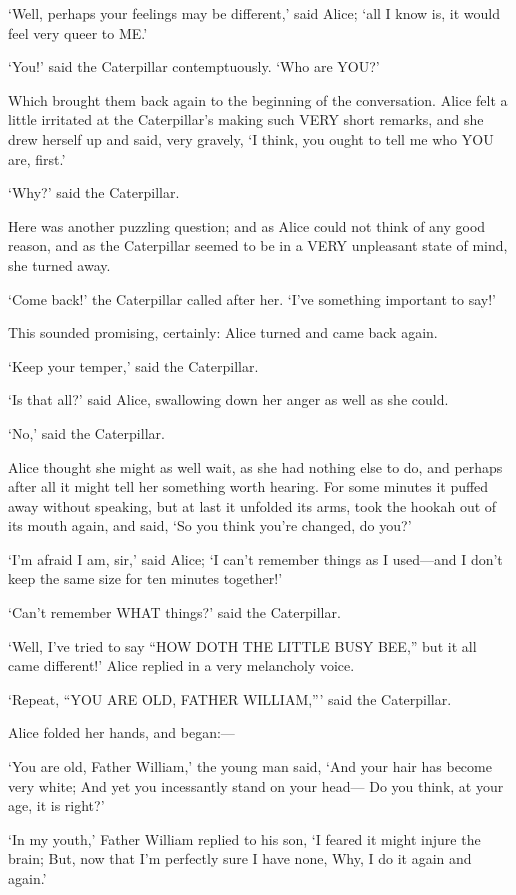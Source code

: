 \documentclass[12pt]{article}
\begin{document}
\begin{Parallel}[p]{}{}
{‘Well, perhaps your feelings may be different,’ said Alice; ‘all I know is, it would feel very queer to ME.’

‘You!’ said the Caterpillar contemptuously. ‘Who are YOU?’

Which brought them back again to the beginning of the conversation. Alice felt a little irritated at the Caterpillar’s making such VERY short remarks, and she drew herself up and said, very gravely, ‘I think, you ought to tell me who YOU are, first.’

‘Why?’ said the Caterpillar.

Here was another puzzling question; and as Alice could not think of any good reason, and as the Caterpillar seemed to be in a VERY unpleasant state of mind, she turned away.

‘Come back!’ the Caterpillar called after her. ‘I’ve something important to say!’

This sounded promising, certainly: Alice turned and came back again.

‘Keep your temper,’ said the Caterpillar.

‘Is that all?’ said Alice, swallowing down her anger as well as she could.

‘No,’ said the Caterpillar.

Alice thought she might as well wait, as she had nothing else to do, and perhaps after all it might tell her something worth hearing. For some minutes it puffed away without speaking, but at last it unfolded its arms, took the hookah out of its mouth again, and said, ‘So you think you’re changed, do you?’

‘I’m afraid I am, sir,’ said Alice; ‘I can’t remember things as I used—and I don’t keep the same size for ten minutes together!’

‘Can’t remember WHAT things?’ said the Caterpillar.

‘Well, I’ve tried to say “HOW DOTH THE LITTLE BUSY BEE,” but it all came different!’ Alice replied in a very melancholy voice.

‘Repeat, “YOU ARE OLD, FATHER WILLIAM,”’ said the Caterpillar.

Alice folded her hands, and began:—

   ‘You are old, Father William,’ the young man said,
    ‘And your hair has become very white;
   And yet you incessantly stand on your head—
    Do you think, at your age, it is right?’

   ‘In my youth,’ Father William replied to his son,
    ‘I feared it might injure the brain;
   But, now that I’m perfectly sure I have none,
    Why, I do it again and again.’

}
\end{Parallel}
\end{document}
